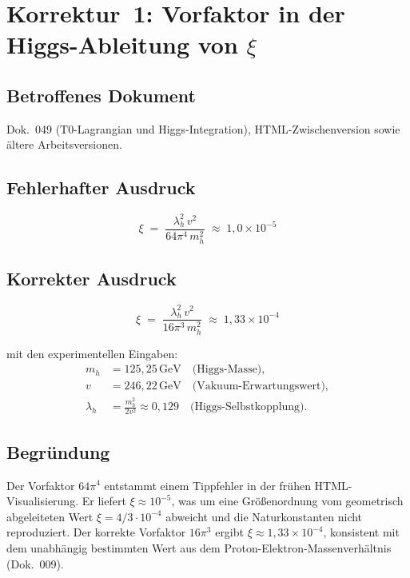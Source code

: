 \section{\texorpdfstring{Korrektur~1: Vorfaktor in der Higgs-Ableitung von $\xi$}{Korrektur 1: Vorfaktor in der Higgs-Ableitung von xi}}

\subsection*{Betroffenes Dokument}

Dok.~049 (T0-Lagrangian und Higgs-Integration), HTML-Zwischenversion
sowie ältere Arbeitsversionen.

\subsection*{Fehlerhafter Ausdruck}

\begin{equation}
  \xi \;=\; \frac{\lambda_h^2\, v^2}{64\pi^4\, m_h^2}
  \;\approx\; 1{,}0 \times 10^{-5}
  \tag{alt -- falsch}
\end{equation}

\subsection*{Korrekter Ausdruck}

\begin{equation}
  \boxed{
    \xi \;=\; \frac{\lambda_h^2\, v^2}{16\pi^3\, m_h^2}
    \;\approx\; 1{,}33 \times 10^{-4}
  }
  \tag{190.1}
\end{equation}

mit den experimentellen Eingaben:
\begin{align*}
  m_h      &= 125{,}25\,\text{GeV} \quad \text{(Higgs-Masse)}, \\
  v        &= 246{,}22\,\text{GeV} \quad \text{(Vakuum-Erwartungswert)}, \\
  \lambda_h &= \frac{m_h^2}{2v^2} \approx 0{,}129
               \quad \text{(Higgs-Selbstkopplung)}.
\end{align*}

\subsection*{Begründung}

Der Vorfaktor $64\pi^4$ entstammt einem Tippfehler in der frühen
HTML-Visualisierung. Er liefert $\xi \approx 10^{-5}$, was um eine
Größenordnung vom geometrisch abgeleiteten Wert
$\xi = 4/3 \cdot 10^{-4}$ abweicht und die Naturkonstanten nicht
reproduziert. Der korrekte Vorfaktor $16\pi^3$ ergibt
$\xi \approx 1{,}33 \times 10^{-4}$, konsistent mit dem unabhängig
bestimmten Wert aus dem Proton-Elektron-Massenverhältnis (Dok.~009).

